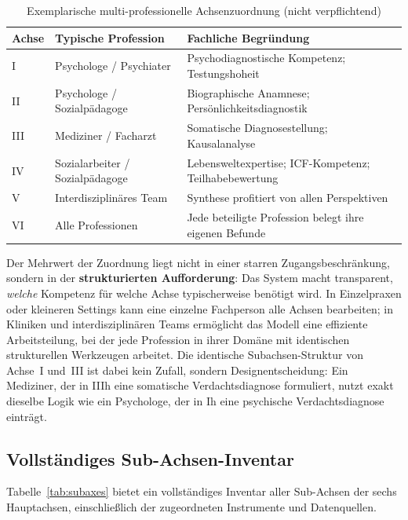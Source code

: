 \documentclass[11pt,a4paper]{article}
\begin{document}
\begin{table}[H]
\centering
\caption{Exemplarische multi-professionelle Achsenzuordnung (nicht verpflichtend)}
\label{tab:professionen}
\begin{tabularx}{\textwidth}{lXX}
\toprule
\textbf{Achse} & \textbf{Typische Profession} & \textbf{Fachliche Begr\"undung} \\
\midrule
I & Psychologe / Psychiater & Psychodiagnostische Kompetenz; Testungshoheit \\
\addlinespace
II & Psychologe / Sozialp\"adagoge & Biographische Anamnese; Pers\"onlichkeitsdiagnostik \\
\addlinespace
III & Mediziner / Facharzt & Somatische Diagnosestellung; Kausalanalyse \\
\addlinespace
IV & Sozialarbeiter / Sozialp\"adagoge & Lebensweltexpertise; ICF-Kompetenz; Teilhabebewertung \\
\addlinespace
V & Interdisziplin\"ares Team & Synthese profitiert von allen Perspektiven \\
\addlinespace
VI & Alle Professionen & Jede beteiligte Profession belegt ihre eigenen Befunde \\
\bottomrule
\end{tabularx}
\end{table}

Der Mehrwert der Zuordnung liegt nicht in einer starren Zugangsbeschr\"ankung, sondern in der \textbf{strukturierten Aufforderung}: Das System macht transparent, \textit{welche} Kompetenz f\"ur welche Achse typischerweise ben\"otigt wird. In Einzelpraxen oder kleineren Settings kann eine einzelne Fachperson alle Achsen bearbeiten; in Kliniken und interdisziplin\"aren Teams erm\"oglicht das Modell eine effiziente Arbeitsteilung, bei der jede Profession in ihrer Dom\"ane mit identischen strukturellen Werkzeugen arbeitet. Die identische Subachsen-Struktur von Achse~I und~III ist dabei kein Zufall, sondern Designentscheidung: Ein Mediziner, der in IIIh eine somatische Verdachtsdiagnose formuliert, nutzt exakt dieselbe Logik wie ein Psychologe, der in Ih eine psychische Verdachtsdiagnose eintr\"agt.

\subsection{Vollst\"andiges Sub-Achsen-Inventar}

Tabelle~\ref{tab:subaxes} bietet ein vollst\"andiges Inventar aller Sub-Achsen der sechs Hauptachsen, einschlie\ss{}lich der zugeordneten Instrumente und Datenquellen.
\end{document}

